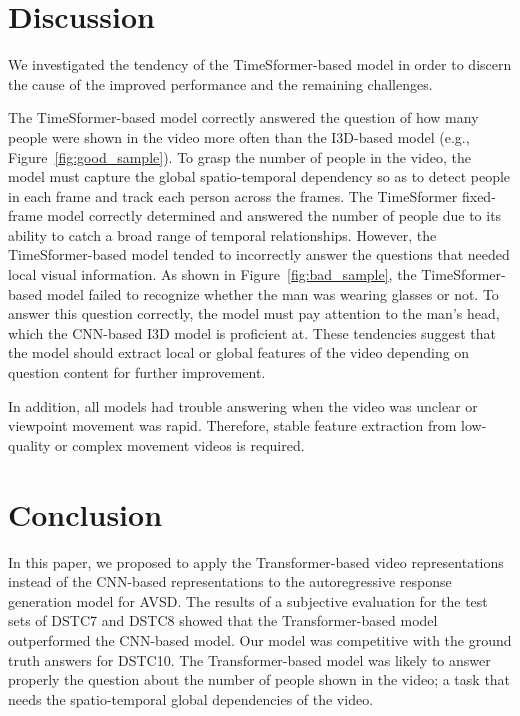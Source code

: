 \documentclass[letterpaper]{article} %
\begin{document}
\section{Discussion}
%
We investigated the tendency of the TimeSformer-based model in order to discern the cause of the improved performance and the remaining challenges.

The TimeSformer-based model correctly answered the question of how many people were shown in the video more often than the I3D-based model (e.g., Figure~\ref{fig:good_sample}).
%
To grasp the number of people in the video, the model must capture the global spatio-temporal dependency so as to detect people in each frame and track each person across the frames.
The TimeSformer fixed-frame model correctly determined and answered the number of people due to its ability to catch a broad range of temporal relationships.
%
%
However, the TimeSformer-based model tended to incorrectly answer the questions that needed local visual information.
As shown in Figure~\ref{fig:bad_sample}, the TimeSformer-based model failed to recognize whether the man was wearing glasses or not.
To answer this question correctly, the model must pay attention to the man's head, which the CNN-based I3D model is proficient at.
%
These tendencies suggest that the model should extract local or global features of the video depending on question content for further improvement.

%
In addition, all models had trouble answering when the video was unclear or viewpoint movement was rapid.
%
Therefore, stable feature extraction from low-quality or complex movement videos is required.

\section{Conclusion}
In this paper, we proposed to apply the Transformer-based video representations instead of the CNN-based representations to the autoregressive response generation model for AVSD.
The results of a subjective evaluation for the test sets of DSTC7 and DSTC8 showed that the Transformer-based model outperformed the CNN-based model.
Our model was competitive with the ground truth answers for DSTC10.
The Transformer-based model was likely to answer properly the question about the number of people shown in the video; a task that needs the spatio-temporal global dependencies of the video.
\end{document}
